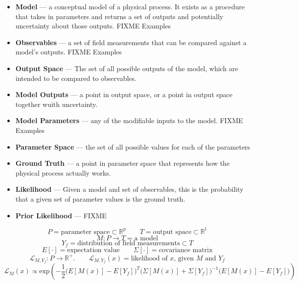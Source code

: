 \documentclass{article}
\begin{document}
\begin{itemize}

\item \textbf{Model} — a conceptual model of a physical process.  It exists as
  a procedure that takes in parameters and returns a set of
  outputs and potentially uncertainty about those outputs. FIXME Examples
 
\item \textbf{Observables} — a set of field measurements that can be compared
  against a model's outputs. FIXME Examples

\item \textbf{Output Space} — The set of all possible outputs of the model,
  which are intended to be compared to observables.

\item \textbf{Model Outputs} — a point in output space, or a point in output
  space together wuith uncertainty.

\item \textbf{Model Parameters} — any of the modifiable inputs to the
  model. FIXME Examples

\item \textbf{Parameter Space} — the set of all possible values for each of the
  parameters

\item \textbf{Ground Truth} — a point in parameter space that represents how
  the physical process actually works.

\item \textbf{Likelihood} — Given a model and set of observables, this is the
  probability that a given set of parameter values is the ground truth.

\item \textbf{Prior Likelihood} — FIXME
\end{itemize}

\newpage

\[ P = \textrm{parameter space} ⊂ ℝ^p \qquad
 T = \textrm{output space} ⊂ ℝ^t \]
\[ M: P → T  = \textrm{a model} \]
\[ Y_f = \textrm{distribution of field measurements} ⊂ T \]
\[ E[·] = \textrm{expectation value} \qquad Σ[·] = \textrm{covariance matrix} \]
\[ ℒ_{M,Y_f}: P → ℝ^+. \qquad
 ℒ_{M,Y_f}(x) = \textrm{likelihood of $x$, given $M$ and $Y_f$} \]
\[
ℒ_M(x) ∝ \textrm{exp}\left({-\frac{1}{2}\big(E[M(x)]-E[Y_f]\big)^T \big(Σ[M(x)]+Σ[Y_f]\big)^{-1} \big(E[M(x)]-E[Y_f]\big)}\right)
\]
\end{document}

